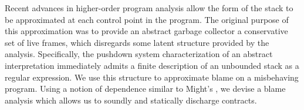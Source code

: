 \documentclass{sigplanconf}
\begin{document}
Recent advances in higher-order program analysis \cite{earl2012introspective} allow the form of the stack to be approximated at each control point in the program.
The original purpose of this approximation was to provide an abstract garbage collector a conservative set of live frames, which disregards some latent structure provided by the analysis.
Specifically, the pushdown system characterization of an abstract interpretation immediately admits a finite description of an unbounded stack as a regular expression.
We use this structure to approximate blame on a misbehaving program.
Using a notion of dependence similar to Might's \cite{might2009interprocedural}, we devise a blame analysis which allows us to soundly and statically discharge contracts.



\end{document}
